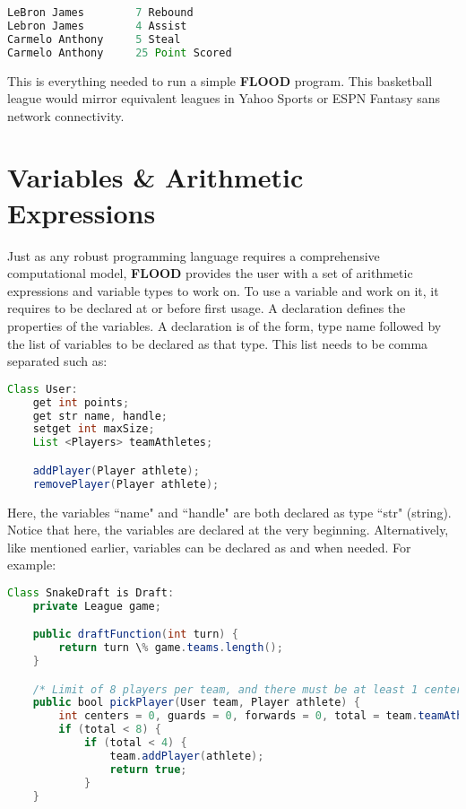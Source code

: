 \documentclass[12pt]{report}
\begin{document}
\begin{lstlisting}[language=Java,label=some-code,caption=Sample Player statistics]
LeBron James		7 Rebound
Lebron James		4 Assist
Carmelo Anthony		5 Steal
Carmelo Anthony		25 Point Scored
\end{lstlisting}

\begin{doublespace}
This is everything needed to run a simple \textbf{FLOOD} program. This basketball league would mirror equivalent leagues in Yahoo Sports or ESPN Fantasy sans network connectivity.  
\end{doublespace}

\section{Variables \& Arithmetic Expressions}

\begin{doublespace}
Just as any robust programming language requires a comprehensive computational model, \textbf{FLOOD} provides the user with a set of arithmetic expressions and variable types to work on. To use a variable and work on it, it requires to be declared at or before first usage. A declaration defines the properties of the variables. A declaration is of the form, type name followed by the list of variables to be declared as that type. This list needs to be comma separated such as:
\end{doublespace}

\begin{lstlisting}[language=Java,label=some-code,caption=User.fld]
Class User:
	get int points;
	get str name, handle;
	setget int maxSize;
	List <Players> teamAthletes;

	addPlayer(Player athlete);
	removePlayer(Player athlete);
\end{lstlisting}

\begin{doublespace}
Here, the variables ``name" and ``handle" are both declared as type ``str" (string). Notice that here, the variables are declared at the very beginning.  Alternatively, like mentioned earlier, variables can be declared as and when needed. For example:
\end{doublespace}

\begin{lstlisting}[language=Java,label=some-code,caption=SnakeDraft.fld]
Class SnakeDraft is Draft:
	private League game;

	public draftFunction(int turn) {
		return turn \% game.teams.length();
	}

	/* Limit of 8 players per team, and there must be at least 1 center, 2 guards and 2 forwards per team. */
	public bool pickPlayer(User team, Player athlete) {
		int centers = 0, guards = 0, forwards = 0, total = team.teamAthletes.size();
		if (total < 8) {
			if (total < 4) {
				team.addPlayer(athlete);
				return true;
			}
	}
\end{lstlisting}
\end{document}
